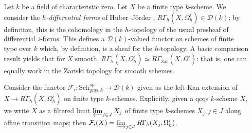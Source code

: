 \documentclass[reqno]{amsart}
\newcommand{\sF}{\mathcal{F}}
\newcommand{\D}{\mathcal{D}}
\theoremstyle{definition}
\begin{document}
Let $k$ be a field of characteristic zero. 
Let $X$ be a finite type $k$-scheme. 
We consider the \emph{$h$-differential forms} of Huber--J\"order \cite{HJ14}, 
$R \Gamma_h(X, \Omega^i_h) \in \D(k)$; by definition, this is the cohomology in
the $h$-topology of the usual presheaf of differential $i$-forms.  
This defines a $\D(k)$-valued functor 
on schemes of finite type over $k$ which, by definition, is a sheaf for the
$h$-topology.
A basic comparison result \cite[Cor.~6.5]{HJ14} yields that 
for $X$ smooth, 
$R \Gamma_h(X, \Omega^i_h) \simeq R \Gamma_{\mathrm{Zar}}(X, \Omega^i)$: that
is, one can equally work in the Zariski topology for smooth schemes. 

Consider the functor
$\sF_i\colon \mathrm{Sch}_{qcqs,k}^{op} \to \D(k)$ given as the left Kan extension of $X \mapsto R
\Gamma_h( X,  \Omega^i_h)$ on finite type $k$-schemes.
Explicitly, given a qcqs $k$-scheme $X$, we write $X$ as a
filtered limit $\varprojlim_{j \in J} X_j$ of finite type $k$-schemes $X_j, j
\in J$ along affine transition maps; then 
$\sF_i(X) = \varinjlim_{j \in J} R \Gamma_h(X_j, \Omega^i_h)$. 
\end{document}
